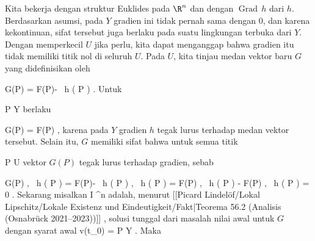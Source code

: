{

Kita bekerja dengan struktur Euklides pada $\R^n$ dan dengan
$\operatorname{Grad} \,  h$ dari $h$. Berdasarkan asumsi, pada $Y$ gradien ini tidak pernah sama dengan $0$, dan karena kekontinuan, sifat tersebut juga berlaku pada suatu lingkungan terbuka dari $Y$. Dengan memperkecil $U$ jika perlu, kita dapat menganggap bahwa gradien itu tidak memiliki titik nol di seluruh $U$. Pada $U$, kita tinjau medan vektor baru $G$ yang didefinisikan oleh

\mavergleichskettedisp
{\vergleichskette
{ G(P)
}
{ =} { F(P)-  {  }
 \,  h  (  P )
}
{ } {
}
{ } {
}
{ } {
}
}
{}{}{.}
Untuk

\mavergleichskette
{\vergleichskette
{ P
}
{ \in }{ Y
}
{  }{
}
{    }{
}
{   }{
}
}
{}{}{}
berlaku

\mavergleichskette
{\vergleichskette
{ G(P)
}
{ = }{ F(P)
}
{  }{
}
{    }{
}
{   }{
}
}
{}{}{,}
karena pada $Y$ gradien $h$ tegak lurus terhadap medan vektor tersebut. Selain itu, $G$
 {} {}
memiliki sifat bahwa untuk semua titik

\mavergleichskette
{\vergleichskette
{ P
}
{ \in }{ U
}
{  }{
}
{    }{
}
{   }{
}
}
{}{}{}
vektor $G(P)$ tegak lurus terhadap gradien, sebab

\mavergleichskettealignhandlinks
{\vergleichskettealignhandlinks
{ \left\langle  G(P) ,
 \,  h  (  P )   \right\rangle
}
{ =} { \left\langle  F(P)- {  }
 \,  h  (  P )  ,
 \,  h  (  P )   \right\rangle
}
{ =} { \left\langle  F(P) ,
 \,  h  (  P )   \right\rangle - \left\langle  F(P) ,
 \,  h  (  P )   \right\rangle
}
{ =} { 0
}
{ } {
}
}
{}
{}{.}
Sekarang misalkan
 { I} { \R^n
} {}
adalah, menurut
[[Picard Lindelöf/Lokal Lipschitz/Lokale Existenz und Eindeutigkeit/Fakt|Teorema 56.2 (Analisis (Osnabrück 2021--2023))]]
 {} {}
,
solusi tunggal dari masalah nilai awal untuk $G$ dengan syarat awal
\mavergleichskette
{\vergleichskette
{ v(t_0)
}
{ = }{ P
}
{ \in }{ Y
}
{    }{
}
{   }{
}
}
{}{}{.}
Maka

}
